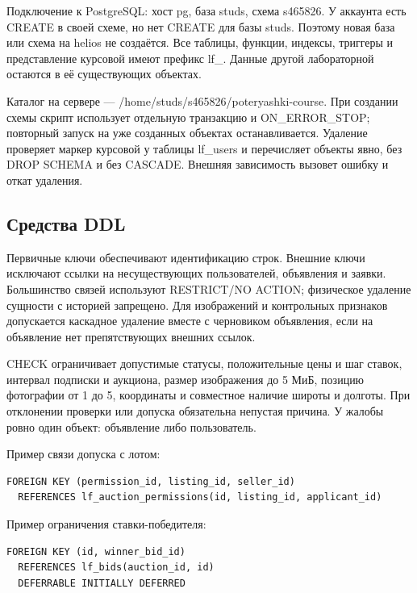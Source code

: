 Подключение к Postgre\allowbreak{}SQL: хост pg, база studs, схема s465826. У аккаунта есть CREATE в своей схеме, но нет CREATE для базы studs. Поэтому новая база или схема на helios не создаётся. Все таблицы, функции, индексы, триггеры и представление курсовой имеют префикс lf\_\allowbreak{}. Данные другой лабораторной остаются в её существующих объектах.

Каталог на сервере — /\allowbreak{}home/\allowbreak{}studs/\allowbreak{}s465826/\allowbreak{}poteryashki-course. При создании схемы скрипт использует отдельную транзакцию и ON\_\allowbreak{}ERROR\_\allowbreak{}STOP; повторный запуск на уже созданных объектах останавливается. Удаление проверяет маркер курсовой у таблицы lf\_\allowbreak{}users и перечисляет объекты явно, без DROP SCHEMA и без CASCADE. Внешняя зависимость вызовет ошибку и откат удаления.

\FloatBarrier
{}
\subsection{Средства DDL}

Первичные ключи обеспечивают идентификацию строк. Внешние ключи исключают ссылки на несуществующих пользователей, объявления и заявки. Большинство связей используют RESTRICT/\allowbreak{}NO ACTION; физическое удаление сущности с историей запрещено. Для изображений и контрольных признаков допускается каскадное удаление вместе с черновиком объявления, если на объявление нет препятствующих внешних ссылок.

CHECK ограничивает допустимые статусы, положительные цены и шаг ставок, интервал подписки и аукциона, размер изображения до 5 МиБ, позицию фотографии от 1 до 5, координаты и совместное наличие широты и долготы. При отклонении проверки или допуска обязательна непустая причина. У жалобы ровно один объект: объявление либо пользователь.

Пример связи допуска с лотом:

\begin{Verbatim}[breaklines=true,breakanywhere=true,fontsize=\footnotesize]
FOREIGN KEY (permission_id, listing_id, seller_id)
  REFERENCES lf_auction_permissions(id, listing_id, applicant_id)
\end{Verbatim}

Пример ограничения ставки-победителя:

\begin{Verbatim}[breaklines=true,breakanywhere=true,fontsize=\footnotesize]
FOREIGN KEY (id, winner_bid_id)
  REFERENCES lf_bids(auction_id, id)
  DEFERRABLE INITIALLY DEFERRED
\end{Verbatim}

